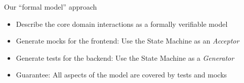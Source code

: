 \begin{frame}[fragile]{Our ``formal model'' approach}

  \begin{itemize}[<+->]
  \item Describe the core domain interactions as a formally verifiable model
  \item Generate mocks for the frontend: Use the State Machine as an \emph{Acceptor}
  \item Generate tests for the backend: Use the State Machine as a \emph{Generator}
  \item Guarantee: All aspects of  the model are covered by tests and mocks
  \end{itemize}

\end{frame}


